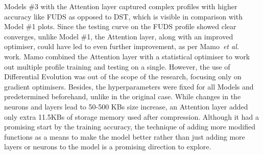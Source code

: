 %
%
Models \#3 with the Attention layer captured complex profiles with higher accuracy like FUDS as opposed to DST, which is visible in comparison with Model \#1 plots.
Since the testing curve on the FUDS profile showed clear converges, unlike Model \#1, the Attention layer, along with an improved optimiser, could have led to even further improvement, as per Mamo~\textit{et al.}~\cite{mamo_long_2020} work.
Mamo combined the Attention layer with a statistical optimiser to work out multiple profile training and testing on a single.
However, the use of Differential Evolution was out of the scope of the research, focusing only on gradient optimisers.
Besides, the hyperparameters were fixed for all Models and predetermined beforehand, unlike in the original case.
While changes in the neurons and layers lead to 50-500 KBs size increase, an Attention layer added only extra 11.5KBs of storage memory used after compression.
Although it had a promising start by the training accuracy, the technique of adding more modified functions as a means to make the model better rather than just adding more layers or neurons to the model is a promising direction to explore.


%

